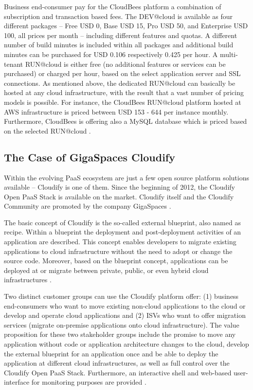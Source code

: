 Business end-consumer pay for the CloudBees platform a combination of subscription and transaction based fees. The DEV@cloud is available as four different packages -- Free USD 0, Base USD 15, Pro USD 50, and Enterprise USD 100, all prices per month -- including different features and quotas. A different number of build minutes is included within all packages and additional build minutes can be purchased for USD 0.106 respectively 0.425 per hour. A multi-tenant RUN@cloud is either free (no additional features or services can be purchased) or charged per hour, based on the select application server and SSL connections. As mentioned above, the dedicated RUN@cloud can basically be hosted at any cloud infrastructure, with the result that a vast number of pricing models is possible. For instance, the CloudBees RUN@cloud platform hosted at \ac{AWS} infrastructure is priced between USD 153 - 644 per instance monthly. Furthermore, CloudBees is offering also a MySQL database which is priced based on the selected RUN@cloud \citep{CloudBees2013}.
\newpage


\subsection{The Case of GigaSpaces Cloudify}\label{ch:sota:gsc}

Within the evolving \ac{PaaS} ecosystem are just a few open source platform solutions available -- Cloudify is one of them. Since the beginning of 2012, the Cloudify Open \ac{PaaS} Stack is available on the market. Cloudify itself and the Cloudify Community are promoted by the company GigaSpaces \citep{GigaSpaces2013a}.

The basic concept of Cloudify is the so-called external blueprint, also named as recipe. Within a blueprint the deployment and post-deployment activities of an application are described. This concept enables developers to migrate existing applications to cloud infrastructure without the need to adopt or change the source code. Moreover, based on the blueprint concept, applications can be deployed at or migrate between private, public, or even hybrid cloud infrastructures \citep{GigaSpaces2013a}.

Two distinct customer groups can use the Cloudify platform offer: (1) business end-consumers who want to move existing non-cloud applications to the cloud or develop and operate cloud applications and (2) \acp{ISV} who want to offer migration services (migrate on-premise applications onto cloud infrastructure). The value proposition for these two stakeholder groups include the promise to move any application without code or application architecture changes to the cloud, develop the external blueprint for an application once and be able to deploy the application at different cloud infrastructures, as well as full control over the Cloudify Open \ac{PaaS} Stack. Furthermore, an interactive shell and web-based user-interface for monitoring purposes are provided \citep{GigaSpaces2013a}.

